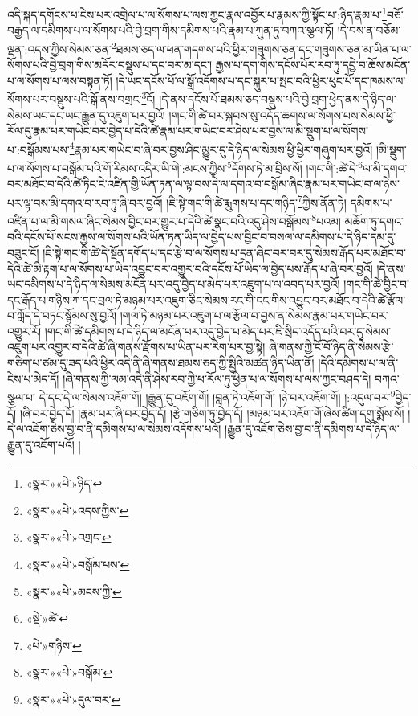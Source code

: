 འདི་སྐད་དགོངས་པ་ངེས་པར་འགྲེལ་པ་ལ་སོགས་པ་ལས་ཀྱང་རྣལ་འབྱོར་པ་རྣམས་ཀྱི་སྟོང་པ་:ཉིད་རྣམ་པ་\footnote{«སྣར་»«པེ་»ཉིད་}བཅོ་བརྒྱད་ལ་དམིགས་པ་ལ་སོགས་པའི་བྱེ་བྲག་གིས་དམིགས་པའི་རྣམ་པ་ཀུན་ཏུ་བཀའ་སྩལ་ཏོ། །དེ་བས་ན་བཅོམ་ལྡན་:འདས་ཀྱིས་སེམས་ཅན་\footnote{«སྣར་»«པེ་»འདས་ཀྱིས་}ཐམས་ཅད་ལ་ཕན་གདགས་པའི་ཕྱིར་གཟུགས་ཅན་དང་གཟུགས་ཅན་མ་ཡིན་པ་ལ་སོགས་པའི་བྱེ་བྲག་གིས་མདོར་བསྡུས་པ་དང་བར་མ་དང་། རྒྱས་པ་དག་གིས་དངོས་པོར་རབ་ཏུ་དབྱེ་བ་ཆོས་མངོན་པ་ལ་སོགས་པ་ལས་བསྟན་ཏོ། །དེ་ཡང་དངོས་པོ་ལ་སྒྲོ་འདོགས་པ་དང་སྐུར་པ་སྤང་བའི་ཕྱིར་ཕུང་པོ་དང་ཁམས་ལ་སོགས་པར་བསྡུས་པའི་སྒོ་ནས་བགྲང་\footnote{«སྣར་»«པེ་»འགྲང་}ངོ། །དེ་ནས་དངོས་པོ་ཐམས་ཅད་བསྡུས་པའི་བྱེ་བྲག་ཕྱེད་ནས་དེ་ཉིད་ལ་སེམས་ཡང་དང་ཡང་རྒྱུན་དུ་འཇུག་པར་བྱའོ། །གང་གི་ཚེ་བར་སྐབས་སུ་འདོད་ཆགས་ལ་སོགས་པས་སེམས་ཕྱི་རོལ་དུ་རྣམ་པར་གཡེང་བར་བྱེད་པ་དེའི་ཚེ་རྣམ་པར་གཡེང་བར་ཤེས་པར་བྱས་ལ་མི་སྡུག་པ་ལ་སོགས་པ་:བསྒོམས་པས་\footnote{«སྣར་»«པེ་»བསྒོམ་པས་}རྣམ་པར་གཡེང་བ་ཞི་བར་བྱས་ཤིང་མྱུར་དུ་དེ་ཉིད་ལ་སེམས་ཕྱི་ཕྱིར་གཞུག་པར་བྱའོ། །མི་སྡུག་པ་ལ་སོགས་པ་བསྒོམ་པའི་གོ་རིམས་འདིར་ཡི་གེ་:མངས་ཀྱིས་\footnote{«སྣར་»«པེ་»མངས་ཀྱི་}དོགས་ཏེ་མ་བྲིས་སོ། །གང་གི་:ཚེ་དེ་\footnote{«སྡེ་»ཚེ་}ལ་མི་དགའ་བར་མཐོང་བ་དེའི་ཚེ་ཏིང་ངེ་འཛིན་གྱི་ཡོན་ཏན་ལ་ལྟ་བས་དེ་ལ་དགའ་བ་བསྒོམ་ཞིང་རྣམ་པར་གཡེང་བ་ལ་ཉེས་པར་ལྟ་བས་མི་དགའ་བ་རབ་ཏུ་ཞི་བར་བྱའོ། །ཇི་སྟེ་གང་གི་ཚེ་རྨུགས་པ་དང་གཉིད་\footnote{«པེ་»གཉིས་}ཀྱིས་ནོན་ཏེ། དམིགས་པ་འཛིན་པ་ལ་མི་གསལ་ཞིང་སེམས་བྱིང་བར་གྱུར་པ་དེའི་ཚེ་སྣང་བའི་འདུ་ཤེས་བསྒོམས་\footnote{«སྣར་»«པེ་»བསྒོམ་}པའམ། མཆོག་ཏུ་དགའ་བའི་དངོས་པོ་སངས་རྒྱས་ལ་སོགས་པའི་ཡོན་ཏན་ཡིད་ལ་བྱེད་པས་བྱིང་བ་བསལ་ལ་དམིགས་པ་དེ་ཉིད་དམ་དུ་བཟུང་ངོ། །ཇི་སྟེ་གང་གི་ཚེ་དེ་སྔོན་དགོད་པ་དང་རྩེ་བ་ལ་སོགས་པ་དྲན་ཞིང་བར་བར་དུ་སེམས་རྒོད་པར་མཐོང་བ་དེའི་ཚེ་མི་རྟག་པ་ལ་སོགས་པ་ཡིད་འབྱུང་བར་འགྱུར་བའི་དངོས་པོ་ཡིད་ལ་བྱེད་པས་རྒོད་པ་ཞི་བར་བྱའོ། །དེ་ནས་ཡང་དམིགས་པ་དེ་ཉིད་ལ་སེམས་མངོན་པར་འདུ་བྱེད་པ་མེད་པར་འཇུག་པ་ལ་འབད་པར་བྱའོ། །གང་གི་ཚེ་བྱིང་བ་དང་རྒོད་པ་གཉིས་ཀ་དང་བྲལ་ཏེ་མཉམ་པར་འཇུག་ཅིང་སེམས་རང་གི་ངང་གིས་འབྱུང་བར་མཐོང་བ་དེའི་ཚེ་རྩོལ་བ་ཀློད་དེ་བཏང་སྙོམས་སུ་བྱའོ། །གལ་ཏེ་མཉམ་པར་འཇུག་པ་ལ་རྩོལ་བ་བྱས་ན་སེམས་རྣམ་པར་གཡེང་བར་འགྱུར་རོ། །གང་གི་ཚེ་དམིགས་པ་དེ་ཉིད་ལ་མངོན་པར་འདུ་བྱེད་པ་མེད་པར་ཇི་སྲིད་འདོད་པའི་བར་དུ་སེམས་འཇུག་པར་འགྱུར་བ་དེའི་ཚེ་ཞི་གནས་རྫོགས་པ་ཡིན་པར་རིག་པར་བྱ་སྟེ། ཞི་གནས་ཀྱི་ངོ་བོ་ཉིད་ནི་སེམས་རྩེ་གཅིག་པ་ཙམ་དུ་ཟད་པའི་ཕྱིར་འདི་ནི་ཞི་གནས་ཐམས་ཅད་ཀྱི་སྤྱིའི་མཚན་ཉིད་ཡིན་ནོ། །དེའི་དམིགས་པ་ལ་ནི་ངེས་པ་མེད་དོ། །ཞི་གནས་ཀྱི་ལམ་འདི་ནི་ཤེས་རབ་ཀྱི་ཕ་རོལ་ཏུ་ཕྱིན་པ་ལ་སོགས་པ་ལས་ཀྱང་བཤད་དེ། བཀའ་སྩལ་པ། དེ་དང་དེ་ལ་སེམས་འཇོག་གོ། །རྒྱུན་དུ་འཇོག་གོ། །བླན་ཏེ་འཇོག་གོ། །ཉེ་བར་འཇོག་གོ། །:འདུལ་བར་\footnote{«སྣར་»«པེ་»དུལ་བར་}བྱེད་དོ། །ཞི་བར་བྱེད་དོ། །རྣམ་པར་ཞི་བར་བྱེད་དོ། །རྩེ་གཅིག་ཏུ་བྱེད་དོ། །མཉམ་པར་འཇོག་གོ་ཞེས་ཚིག་དགུ་སྨོས་སོ། །དེ་ལ་འཇོག་ཅེས་བྱ་བ་ནི་དམིགས་པ་ལ་སེམས་འདོགས་པའོ། །རྒྱུན་དུ་འཇོག་ཅེས་བྱ་བ་ནི་དམིགས་པ་དེ་ཉིད་ལ་རྒྱུན་དུ་འཇོག་པའོ། །
